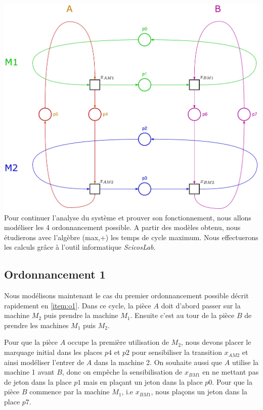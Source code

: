 \includegraphics[width = \textwidth]{./II/images/GET.pdf}
Pour continuer l'analyse du système et prouver son fonctionnement, nous allons modéliser les 4 ordonnancement possible. A partir des modèles obtenu, nous étudierons avec l'algèbre (max,+) les temps de cycle maximum. Nous effectuerons les calculs grâce à l'outil informatique \emph{ScicosLab}.
\subsection{Ordonnancement 1}\label{sub:ordo1}

Nous modélisons maintenant le cas du premier ordonnancement possible décrit rapidement en \ref{item:o1}. Dans ce cycle, la pièce $A$ doit d'abord passer sur la machine $M_2$ puis prendre la machine $M_1$. Ensuite c'est au tour de la pièce $B$ de prendre les machines $M_1$ puis $M_2$. 

Pour que la pièce $A$ occupe la première utilisation de $M_2$, nous devons placer le marquage initial dans les places $p4$ et $p2$ pour sensibiliser la transition $x_{AM2}$ et ainsi modéliser l'entrer de $A$ dans la machine 2. On souhaite aussi que $A$ utilise la machine 1 avant $B$, donc on empêche la sensibilisation de $x_{BM1}$ en ne mettant pas de jeton dans la place $p1$ mais en plaçant un jeton dans la place $p0$. Pour que la pièce $B$ commence par la machine $M_1$, i.e $x_{BM1}$, nous plaçons un jeton dans la place $p7$. 

